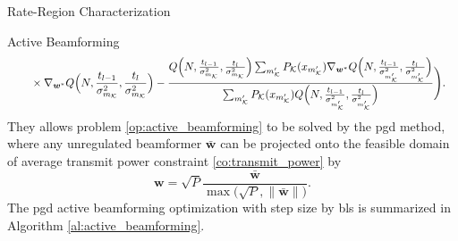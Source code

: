 \documentclass[journal,12pt,onecolumn,draftclsnofoot]{IEEEtran}
\theoremstyle{remark}
\begin{document}
\begin{section}{Rate-Region Characterization}
\begin{subsection}{Active Beamforming}
\begin{align}
			 & \qquad \times \nabla_{\boldsymbol{w}^*} Q\Bigl(N,\frac{t_{l-1}}{\sigma_{m_{\mathcal{K}}}^2},\frac{t_l}{\sigma_{m_{\mathcal{K}}}^2}\Bigr)-\frac{Q\Bigl(N,\frac{t_{l-1}}{\sigma_{m_{\mathcal{K}}}^2},\frac{t_l}{\sigma_{m_{\mathcal{K}}}^2}\Bigr)\sum_{m_{\mathcal{K}}'}P_{\mathcal{K}}(x_{m_{\mathcal{K}}'})\nabla_{\boldsymbol{w}^*}Q\Bigl(N,\frac{t_{l-1}}{\sigma_{m_{\mathcal{K}}'}^2},\frac{t_l}{\sigma_{m_{\mathcal{K}}'}^2}\Bigr)}{\sum_{m_{\mathcal{K}}'}P_{\mathcal{K}}(x_{m_{\mathcal{K}}'})Q\Bigl(N,\frac{t_{l-1}}{\sigma_{m_{\mathcal{K}}'}^2},\frac{t_l}{\sigma_{m_{\mathcal{K}}'}^2}\Bigr)}\Biggr).
			\label{eq:weighted_sum_mutual_information_gradient}
		\end{align}
		They allows problem \eqref{op:active_beamforming} to be solved by the \gls{pgd} method, where any unregulated beamformer $\bar{\boldsymbol{w}}$ can be projected onto the feasible domain of average transmit power constraint \eqref{co:transmit_power} by
		\begin{equation}
			\boldsymbol{w} = \sqrt{P} \frac{\bar{\boldsymbol{w}}}{\max\bigl(\sqrt{P},\lVert\bar{\boldsymbol{w}}\rVert\bigr)}.
			\label{eq:beamforming_projection}
		\end{equation}
		The \gls{pgd} active beamforming optimization with step size by \gls{bls} \cite[Section 9.2]{Boyd2004} is summarized in Algorithm \ref{al:active_beamforming}.


\end{subsection}
\end{section}
\end{document}
